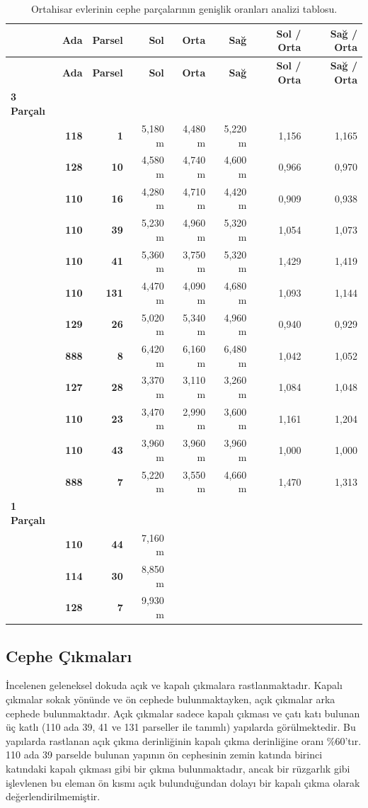 \documentclass[12pt,turkish,a4paperpaper,]{report}
\begin{document}
\begin{longtable}[]{@{}lrrrrrrr@{}}
\caption{Ortahisar evlerinin cephe parçalarının genişlik oranları
analizi tablosu. \label{genislikoranlari}}\tabularnewline
\toprule
& \textbf{Ada} & \textbf{Parsel} & \textbf{Sol} & \textbf{Orta} &
\textbf{Sağ} & \textbf{Sol / Orta} & \textbf{Sağ / Orta}\tabularnewline
\midrule
\endfirsthead
\toprule
& \textbf{Ada} & \textbf{Parsel} & \textbf{Sol} & \textbf{Orta} &
\textbf{Sağ} & \textbf{Sol / Orta} & \textbf{Sağ / Orta}\tabularnewline
\midrule
\endhead
\textbf{3 Parçalı} & & & & & & &\tabularnewline
& \textbf{118} & \textbf{1} & 5,180 m & 4,480 m & 5,220 m & 1,156 &
1,165\tabularnewline
& \textbf{128} & \textbf{10} & 4,580 m & 4,740 m & 4,600 m & 0,966 &
0,970\tabularnewline
& \textbf{110} & \textbf{16} & 4,280 m & 4,710 m & 4,420 m & 0,909 &
0,938\tabularnewline
& \textbf{110} & \textbf{39} & 5,230 m & 4,960 m & 5,320 m & 1,054 &
1,073\tabularnewline
& \textbf{110} & \textbf{41} & 5,360 m & 3,750 m & 5,320 m & 1,429 &
1,419\tabularnewline
& \textbf{110} & \textbf{131} & 4,470 m & 4,090 m & 4,680 m & 1,093 &
1,144\tabularnewline
& \textbf{129} & \textbf{26} & 5,020 m & 5,340 m & 4,960 m & 0,940 &
0,929\tabularnewline
& \textbf{888} & \textbf{8} & 6,420 m & 6,160 m & 6,480 m & 1,042 &
1,052\tabularnewline
& \textbf{127} & \textbf{28} & 3,370 m & 3,110 m & 3,260 m & 1,084 &
1,048\tabularnewline
& \textbf{110} & \textbf{23} & 3,470 m & 2,990 m & 3,600 m & 1,161 &
1,204\tabularnewline
& \textbf{110} & \textbf{43} & 3,960 m & 3,960 m & 3,960 m & 1,000 &
1,000\tabularnewline
& \textbf{888} & \textbf{7} & 5,220 m & 3,550 m & 4,660 m & 1,470 &
1,313\tabularnewline
\textbf{1 Parçalı} & & & & & & &\tabularnewline
& \textbf{110} & \textbf{44} & 7,160 m & & & &\tabularnewline
& \textbf{114} & \textbf{30} & 8,850 m & & & &\tabularnewline
& \textbf{128} & \textbf{7} & 9,930 m & & & &\tabularnewline
\bottomrule
\end{longtable}

\hypertarget{cephe-uxe7ux131kmalarux131}{%
\subsection{Cephe Çıkmaları}\label{cephe-uxe7ux131kmalarux131}}

İncelenen geleneksel dokuda açık ve kapalı çıkmalara rastlanmaktadır.
Kapalı çıkmalar sokak yönünde ve ön cephede bulunmaktayken, açık
çıkmalar arka cephede bulunmaktadır. Açık çıkmalar sadece kapalı çıkması
ve çatı katı bulunan üç katlı (110 ada 39, 41 ve 131 parseller ile
tanımlı) yapılarda görülmektedir. Bu yapılarda rastlanan açık çıkma
derinliğinin kapalı çıkma derinliğine oranı \%60'tır. 110 ada 39
parselde bulunan yapının ön cephesinin zemin katında birinci katındaki
kapalı çıkması gibi bir çıkma bulunmaktadır, ancak bir rüzgarlık gibi
işlevlenen bu eleman ön kısmı açık bulunduğundan dolayı bir kapalı çıkma
olarak değerlendirilmemiştir.
\end{document}
